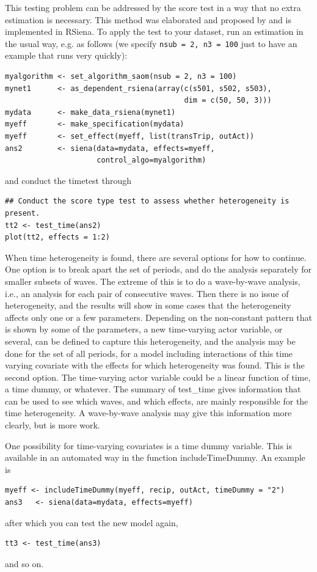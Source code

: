 \documentclass[a4paper,fleqn,11pt]{article}
\newcommand{\+}{\, + \,}
\newcommand{\sfn}[1]{\textsf{#1}}
\begin{document}
This testing problem can be addressed by the score test in a way that
no extra estimation is necessary. This method was elaborated and proposed by
\citet{Lospinoso2011} and is implemented in RSiena.  To apply the
test to your dataset, run an estimation in the usual way, e.g. as follows
(we specify \texttt{nsub = 2, n3 = 100} just to have an example that runs
very quickly):
\begin{verbatim}
myalgorithm <- set_algorithm_saom(nsub = 2, n3 = 100)
mynet1      <- as_dependent_rsiena(array(c(s501, s502, s503),
                                         dim = c(50, 50, 3)))
mydata      <- make_data_rsiena(mynet1)
myeff       <- make_specification(mydata)
myeff       <- set_effect(myeff, list(transTrip, outAct))
ans2        <- siena(data=mydata, effects=myeff,
                     control_algo=myalgorithm)
\end{verbatim}
and conduct the timetest through
\begin{verbatim}
## Conduct the score type test to assess whether heterogeneity is present.
tt2 <- test_time(ans2)
plot(tt2, effects = 1:2)
\end{verbatim}

When time heterogeneity is found, there are several options for how to continue.
One option is to break apart the set of periods, and do the analysis separately
for smaller subsets of waves. The extreme of this is to do a wave-by-wave analysis,
i.e., an analysis for each pair of consecutive waves.
Then there is no issue of heterogeneity, and the results
will show in some cases that the heterogeneity affects only one or a few parameters.
Depending on the non-constant pattern that is shown by some of the parameters,
a new time-varying actor variable, or several, can be defined to
capture this heterogeneity,
and the analysis may be done for the set of all periods, for a model including
interactions of this time varying covariate with the effects for
which heterogeneity was found. This is the second option.
The time-varying actor variable could be a linear function of time, a time dummy,
or whatever.
The summary of \sfn{test\_time} gives information that can
be used to see which waves, and which effects, are mainly responsible for
the time heterogeneity. A wave-by-wave analysis may give this information
more clearly, but is more work.

One possibility for time-varying covariates is a time dummy variable.
This is available in an automated way in the
function \sfn{includeTimeDummy}. An example is
\begin{verbatim}
myeff <- includeTimeDummy(myeff, recip, outAct, timeDummy = "2")
ans3   <- siena(data=mydata, effects=myeff)
\end{verbatim}
after which you can test the new model again,
\begin{verbatim}
tt3 <- test_time(ans3)
\end{verbatim}
and so on.
\medskip
\end{document}
